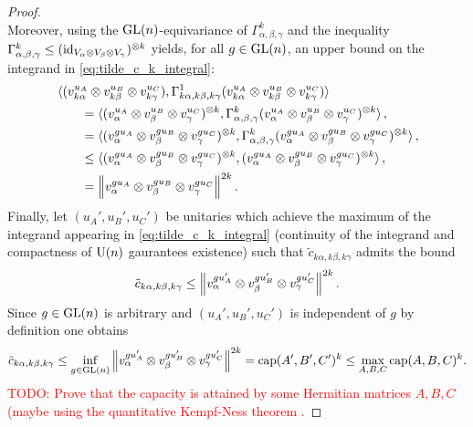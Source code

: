 \documentclass[notitlepage, 10pt]{article}
\begin{document}
\begin{proof}
\begin{equation}
    \end{equation}
    Moreover, using the $\operatorname{GL}(n)$-equivariance of $\Gamma_{\alpha,\beta,\gamma}^{k}$ and the inequality $\Gamma_{\alpha,\beta,\gamma}^{k} \leq (\operatorname{id}_{V_{\alpha}\otimes V_{\beta} \otimes V_{\gamma}})^{\otimes k}$ yields, for all $g \in \operatorname{GL}(n)$, an upper bound on the integrand in \cref{eq:tilde_c_k_integral}:    \begin{align}
        &\braket{(v_{k\alpha}^{u_A} \otimes v_{k\beta}^{u_B} \otimes v_{k\gamma}^{u_C}), \Gamma_{k\alpha,k\beta,k\gamma}^{1} (v_{k\alpha}^{u_A} \otimes v_{k\beta}^{u_B} \otimes v_{k\gamma}^{u_C})}\\
        &\qquad=\braket{(v_{\alpha}^{u_A} \otimes v_{\beta}^{u_B} \otimes v_{\gamma}^{u_C})^{\otimes k}, \Gamma_{\alpha,\beta,\gamma}^{k} (v_{\alpha}^{u_A} \otimes v_{\beta}^{u_B} \otimes v_{\gamma}^{u_C})^{\otimes k}}, \\
        &\qquad=\braket{(v_{\alpha}^{gu_A} \otimes v_{\beta}^{gu_B} \otimes v_{\gamma}^{gu_C})^{\otimes k}, \Gamma_{\alpha,\beta,\gamma}^{k} (v_{\alpha}^{gu_A} \otimes v_{\beta}^{gu_B} \otimes v_{\gamma}^{gu_C})^{\otimes k}}, \\
        &\qquad\leq\braket{(v_{\alpha}^{gu_A} \otimes v_{\beta}^{gu_B} \otimes v_{\gamma}^{gu_C})^{\otimes k}, (v_{\alpha}^{gu_A} \otimes v_{\beta}^{gu_B} \otimes v_{\gamma}^{gu_C})^{\otimes k}}, \\
        &\qquad= \left\lVert v_\alpha^{gu_A} \otimes v_\beta^{gu_B} \otimes v_\gamma^{gu_C}\right\rVert^{2k}.
    \end{align}
    Finally, let $(u_{A}',u_{B}',u_{C}')$ be unitaries which achieve the maximum of the integrand appearing in \cref{eq:tilde_c_k_integral} (continuity of the integrand and compactness of $\operatorname{U}(n)$ gaurantees existence) such that $\tilde c_{k\alpha,k\beta,k\gamma}$ admits the bound
    \begin{equation}
        \tilde c_{k\alpha, k\beta, k\gamma} \leq \left\lVert v_\alpha^{gu_A'} \otimes v_\beta^{gu_B'} \otimes v_\gamma^{gu_C'}\right\rVert^{2k}.
    \end{equation}
    Since $g \in \operatorname{GL}(n)$ is arbitrary and $(u_{A}',u_{B}',u_{C}')$ is independent of $g$ by definition one obtains
    \begin{equation}
        \tilde c_{k\alpha, k\beta, k\gamma} \leq \inf_{g \in \operatorname{GL}(n)} \left\lVert v_\alpha^{gu_A'} \otimes v_\beta^{gu_B'} \otimes v_\gamma^{gu_C'}\right\rVert^{2k} = \operatorname{cap}(A',B',C')^{k} \leq \max_{A,B,C}\operatorname{cap}(A,B,C)^{k}.
    \end{equation}
    \textcolor{red}{TODO: Prove that the capacity is attained by some Hermitian matrices $A,B,C$ (maybe using the quantitative Kempf-Ness theorem \cite[Theorem 1.17]{burgisser2019towards}.}

\end{proof}
\end{document}
